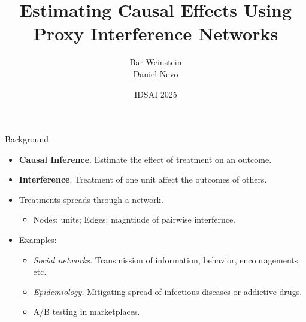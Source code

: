 \documentclass{beamer}
\title{Estimating Causal Effects Using \texorpdfstring{\\}{,} Proxy Interference Networks}
\author{Bar Weinstein \texorpdfstring{\\}{,} Daniel Nevo}
\institute{Statistics \& OR \\ Tel Aviv University}
\date{IDSAI 2025}
\begin{document}
    \begin{frame}
        \maketitle
    \end{frame}
    
    \begin{frame}{Background}
        \large
        \begin{itemize}
            \item<1-> \textbf{Causal Inference}. Estimate the effect of treatment on an outcome. 
            \vspace{0.2cm}
            \item<1-> \textbf{Interference}. Treatment of one unit affect the outcomes of others.
            \vspace{0.2cm}
            \item<1->  Treatments spreads through a network.
            \begin{itemize}
                \item Nodes: units; Edges: magntiude of pairwise interfernce.
            \vspace{0.2cm}
            \end{itemize}
            \item<2-> Examples:
                \begin{itemize}
                    \item \emph{Social networks.} Transmission of information, behavior, encouragements, etc.
                    \vspace{0.05cm}
                    \item \emph{Epidemiology.} Mitigating spread of infectious diseases or addictive drugs.
                    \vspace{0.05cm}
                    \item A/B testing in marketplaces.
                \end{itemize} 
        \end{itemize}
    \end{frame}
\end{document}
